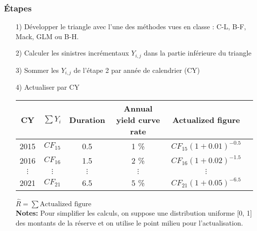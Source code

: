 \subsubsection*{Étapes}
\begin{itemize}
\item[1)] Développer le triangle avec l'une des méthodes vues en classe : C-L, B-F, Mack, GLM ou B-H.
\item[2)] Calculer les sinistres incrémentaux $Y_{i,j}$ dans la partie inférieure du triangle
\item[3)] Sommer les $Y_{i,j}$ de l'étape 2 par année de calendrier (CY)
\item[4)] Actualiser par CY

\begin{center}
\begin{tabular}{|c|c|c|c|c|c|}
  \hline
   CY & $\sum Y_i$ & Duration & Annual yield curve rate & Actualized figure \\
  \hline
  2015 & $CF_{15}$ & 0.5 & 1 \% & $CF_{15} (1 + 0.01)^{-0.5}$ \\
  2016 & $CF_{16}$ & 1.5 & 2 \% &  $CF_{16} (1 + 0.02)^{-1.5}$\\
  $\vdots$ & $\vdots$ & $\vdots$ & $\vdots$ & $\vdots$  \\
  2021 & $CF_{21}$ & 6.5 & 5 \% & $CF_{21} (1 + 0.05)^{-6.5}$  \\
  \hline
\end{tabular}
\end{center}
\bigskip
$ \widehat{R} = \sum \text{Actualized figure}$ 
\\

\textbf{Notes:} Pour simplifier les calculs, on suppose une distribution uniforme [0, 1] des montants de la réserve et on utilise le point milieu pour l'actualisation.
\end{itemize}
